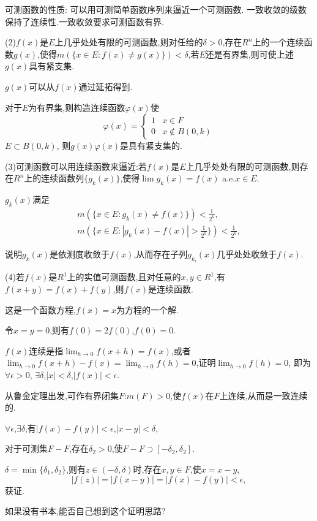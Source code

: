 \documentclass[12pt,a4paper,openany]{book}
\begin{document}
可测函数的性质: 可以用可测简单函数序列来逼近一个可测函数. 一致收敛的级数保持了连续性.一致收敛要求可测函数有界.

(2)$f(x)$是$E$上几乎处处有限的可测函数,则对任给的$\delta>0$,存在$R^n$上的一个连续函数$g(x)$,使得$m(\{x \in E: f(x)\neq g(x)\})<\delta$,若$E$还是有界集,则可使上述$g(x)$具有紧支集.

$g(x)$可以从$f(x)$通过延拓得到.

对于$E$为有界集,则构造连续函数$\varphi(x)$使
\[
\varphi(x) = 
\begin{cases}
1 & x \in F \\
0 & x \notin B(0,k)
\end{cases}
\]
$E \subset B(0,k)$, 则$g(x)\varphi(x)$是具有紧支集的.

(3)可测函数可以用连续函数来逼近:若$f(x)$是$E$上几乎处处有限的可测函数,则存在$R^n$上的连续函数列$\{g_k(x)\}$,使得$\lim{g_k(x)} = f(x)$ a.e.$x \in E$.

$g_k(x)$满足
\begin{gather*}
m(\{x \in E: g_k(x) \neq f(x)\})<\frac{1}{2^k},\\
m(\{x \in E: |g_k(x) - f(x)| > \frac{1}{2^k}\})<\frac{1}{2^k},
\end{gather*}

说明$g_k(x)$是依测度收敛于$f(x)$,从而存在子列$g_{k_i}(x)$几乎处处收敛于$f(x)$.

(4)若$f(x)$是$R^1$上的实值可测函数,且对任意的$x,y\in R^1$,有$f(x+y)=f(x)+f(y)$,则$f(x)$是连续函数.

这是一个函数方程,$f(x)=x$为方程的一个解.

令$x=y=0$,则有$f(0)=2f(0)$,$f(0)=0$.

$f(x)$连续是指$\lim_{h \rightarrow 0}{f(x+h)} = f(x)$,或者$\lim_{h \rightarrow 0}{f(x+h)-f(x)} = \lim_{h \rightarrow 0}{f(h)} = 0$,证明$\lim_{h \rightarrow 0}{f(h)} = 0$, 即为$\forall \epsilon > 0$, $\exists \delta$,$|x|<\delta$,$|f(x)|<\epsilon$.

从鲁金定理出发,可作有界闭集$F$:$m(F)>0$,使$f(x)$在$F$上连续,从而是一致连续的.

$\forall \epsilon$,$\exists \delta$,有$|f(x)-f(y)|<\epsilon$,$|x-y|<\delta$,

对于可测集$F-F$,存在$\delta_2>0$,使$F-F \supset [-\delta_2,\delta_2]$.

$\delta=\min\{\delta_1,\delta_2\}$,则有$z \in (-\delta,\delta)$时,存在$x,y \in F$,使$x=x-y$,
\[
|f(z)|=|f(x-y)|=|f(x)-f(y)|<\epsilon,
\]
获证.

如果没有书本,能否自己想到这个证明思路?
\end{document}
